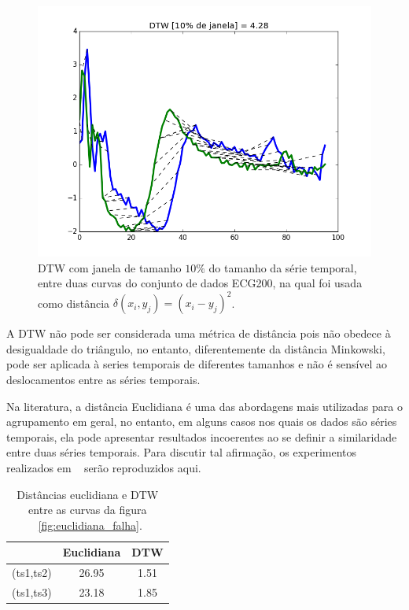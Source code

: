 \begin{figure}
			\centering
			\includegraphics[width=.95\linewidth]{figuras/ECG200_dtw_10_window.png}
			\caption{DTW com janela de tamanho $10\%$ do tamanho da série temporal, entre duas curvas do conjunto de dados ECG200, na qual foi usada como distância $\delta(x_i,y_j) = (x_i-y_j)^2$.}
			\label{fig:sfig3}
	\label{fig:dtw_compare}
\end{figure}

A DTW não pode ser considerada uma métrica de distância pois não obedece à desigualdade do triângulo, no entanto, diferentemente da distância Minkowski, pode ser aplicada à series temporais de diferentes tamanhos e não é sensível ao deslocamentos entre as séries temporais.

Na literatura, a distância Euclidiana é uma das abordagens mais utilizadas para o agrupamento em geral, no entanto, em alguns casos nos quais os dados são séries temporais, ela pode apresentar resultados incoerentes ao se definir a similaridade entre duas séries temporais. Para discutir tal afirmação, os experimentos realizados em ~\parencite{FalhaEuclideana} serão reproduzidos aqui. 

\begin{table}[]
	\centering
	\caption{Distâncias euclidiana e DTW entre as curvas da figura ~\ref{fig:euclidiana_falha}.}
	\label{euclidiana_vs_DTW}
	\begin{tabular}{|c|c|c|}
			\hline
										 				& Euclidiana& DTW\\ 
			\hline
		(ts1,ts2) 	& 26.95 	& 1.51 \\
					\hline					
		(ts1,ts3) 			& 23.18 	& 1.85 \\
					\hline
	\end{tabular}
\end{table}

